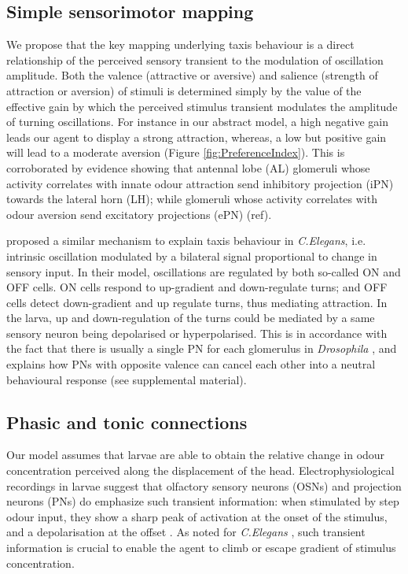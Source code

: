 \documentclass[11pt,a4paper]{article}
\newcommand{\Dros }{\emph{Drosophila }}
\newcommand{\todoAW}[1]{\todo[author=AW,color=green, size=\tiny,inline]{#1}}
\begin{document}
\subsection{Simple sensorimotor mapping}
We propose that the key mapping underlying taxis behaviour is a direct relationship of the perceived sensory transient to the modulation of oscillation amplitude.
Both the valence (attractive or aversive) and salience (strength of attraction or aversion) of stimuli is determined simply by the value of the effective gain by which the perceived stimulus transient modulates the amplitude of turning oscillations. For instance in our abstract model, a high negative gain leads our agent to display a strong attraction, whereas, a low but positive gain will lead to a moderate aversion (Figure \ref{fig:PreferenceIndex}). This is corroborated by evidence showing that antennal lobe (AL) glomeruli whose activity correlates with innate odour attraction send inhibitory projection (iPN) towards the lateral horn (LH); while glomeruli whose activity correlates with odour aversion send excitatory projections (ePN) (ref). 

 \cite{izquierdo2010evolution} proposed a similar mechanism to explain taxis behaviour in {\it C.Elegans}, i.e. intrinsic oscillation modulated by a bilateral signal proportional to change in sensory input. In their model, oscillations are regulated by both so-called ON and OFF cells. ON cells respond to up-gradient and down-regulate turns; and OFF cells detect down-gradient and up regulate turns, thus mediating attraction. In the larva, up and down-regulation of the turns could be mediated by a same sensory neuron being depolarised or hyperpolarised. This is in accordance with the fact that there is usually a single PN for each glomerulus in \Dros \citep{ramaekers2005glomerular} %
 , and explains how PNs with opposite valence can cancel each other into a neutral behavioural response (see supplemental material). 
  
\subsection{Phasic and tonic connections}
Our model assumes that larvae are able to obtain the relative change in odour concentration perceived along the displacement of the head.  Electrophysiological recordings in larvae suggest that olfactory sensory neurons (OSNs) \citep{nagel2011biophysical,schulze2015dynamical} and projection neurons (PNs) do emphasize such transient information: when stimulated by step odour input, they show a sharp peak of activation at the onset of the stimulus, and a depolarisation at the offset \citep{schulze2015dynamical}. As noted for {\it C.Elegans} \citep{lockery2011computational}, such transient information is crucial to enable the agent to climb or escape gradient of stimulus concentration. 
\end{document}
